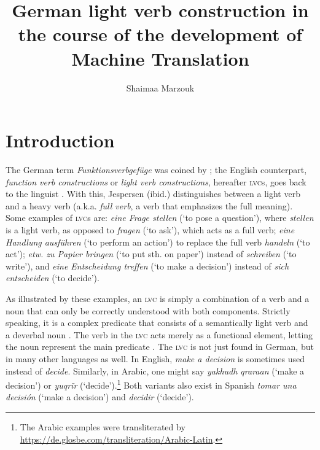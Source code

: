 \documentclass[output=paper]{langsci/langscibook}
\author{Shaimaa Marzouk\affiliation{Johannes Gutenberg University Mainz}}
\title[German light verb construction in the course of the development of MT]
      {German light verb construction in the course of the development of Machine Translation}
\begin{document}
\maketitle

\section{Introduction}\label{marzouk:introduction}

The German term \textit{Funktionsverbgefüge} was coined by \citet[26]{vonPolenz1963}; the English counterpart, \textit{function verb constructions} or \textit{light verb constructions}, hereafter \textsc{lvc}s, goes back to the linguist \citet[117]{Jespersen1942}. With this, Jespersen (ibid.) distinguishes between a light verb and a heavy verb (a.k.a. \textit{full verb}, a verb that emphasizes the full meaning). Some examples of \textsc{lvc}s are: 
\textit{eine Frage stellen} (`to pose a question'), where \textit{stellen} is a light verb, as opposed to \textit{fragen} (`to ask'), which acts as a full verb; \textit{eine Handlung ausführen} (`to perform an action') to replace the full verb \textit{handeln} (`to act'); \textit{etw. zu Papier bringen} (`to put sth. on paper') instead of \textit{schreiben} (`to write'), and \textit{eine Entscheidung treffen} (`to make a decision') instead of \textit{sich entscheiden} (`to decide'). 

As illustrated by these examples, an \textsc{lvc} is simply a combination of a verb and a noun that can only be correctly understood with both components. Strictly speaking, it is a complex predicate that consists of a semantically light verb and a deverbal noun \citep[117]{Jespersen1964}. The verb in the \textsc{lvc} acts merely as a functional element, letting the noun represent the main predicate \citep{Grimshaw1988}. The \textsc{lvc} is not just found in German, but in many other languages as well. In English, \textit{make a decision} is sometimes used instead of \textit{decide}. Similarly, in Arabic, one might say \textit{yakhudh qraraan} (`make a decision') or  \textit{yuqrĩr} (`decide').\footnote{The Arabic examples were transliterated by \url{https://de.glosbe.com/transliteration/Arabic-Latin}.} Both variants also exist in Spanish \textit{tomar una decisión} (`make a decision') and \textit{decidir} (`decide').
\end{document}
